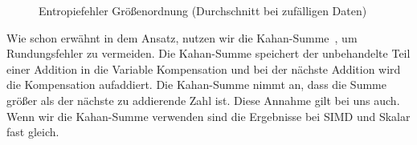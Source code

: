 \begin{figure}[h]
\centering
{}
\caption{Entropiefehler Größenordnung (Durchschnitt bei zufälligen Daten)}
\end{figure}

Wie schon erwähnt in dem Ansatz, nutzen wir die Kahan-Summe~\cite{kahan}, um Rundungsfehler zu vermeiden. Die Kahan-Summe speichert der unbehandelte Teil  einer Addition in die Variable Kompensation und bei der nächste Addition wird die Kompensation aufaddiert. Die Kahan-Summe nimmt an, dass die Summe größer als der nächste zu addierende Zahl ist. Diese Annahme gilt bei uns auch. Wenn wir die Kahan-Summe verwenden sind die Ergebnisse bei SIMD und Skalar fast gleich.
